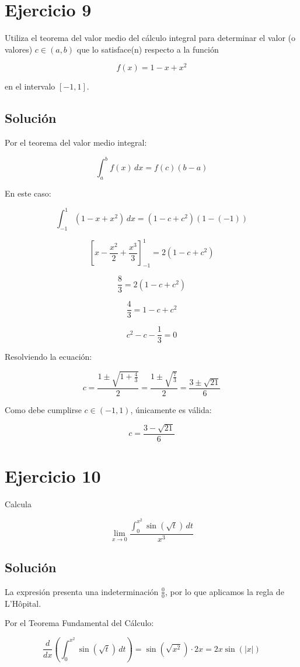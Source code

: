 \documentclass[fleqn]{article}
\begin{document}
\section{Ejercicio 9}
	Utiliza el teorema del valor medio del cálculo integral para determinar el valor
	(o valores) $c\in(a,b)$ que lo satisface(n) respecto a la función

	\[
	f(x)=1-x+x^2
	\]

	en el intervalo $[-1,1]$.

	\subsection{Solución}

	Por el teorema del valor medio integral:

	\[
	\int_a^b f(x)\,dx
	=
	f(c)(b-a)
	\]

	En este caso:

	\[
	\int_{-1}^{1}(1-x+x^2)\,dx
	=
	(1-c+c^2)(1-(-1))
	\]

	\[
	\left[
	x-\frac{x^2}{2}+\frac{x^3}{3}
	\right]_{-1}^{1}
	=
	2(1-c+c^2)
	\]

	\[
	\frac{8}{3}
	=
	2(1-c+c^2)
	\]

	\[
	\frac{4}{3}
	=
	1-c+c^2
	\]

	\[
	c^2-c-\frac{1}{3}=0
	\]

	Resolviendo la ecuación:

	\[
	c
	=
	\frac{1\pm\sqrt{1+\frac{4}{3}}}{2}
	=
	\frac{1\pm\sqrt{\frac{7}{3}}}{2}
	=
	\frac{3\pm\sqrt{21}}{6}
	\]

	Como debe cumplirse $c\in(-1,1)$, únicamente es válida:

	\[
	\boxed{
	c=\frac{3-\sqrt{21}}{6}
	}
	\]

\section{Ejercicio 10}
	Calcula

	\[
	\lim_{x\to0}
	\frac{\displaystyle\int_0^{x^2}\sin(\sqrt{t})\,dt}{x^3}
	\]

	\subsection{Solución}

	La expresión presenta una indeterminación $\frac{0}{0}$, por lo que aplicamos la regla de L'Hôpital.

	Por el Teorema Fundamental del Cálculo:

	\[
	\frac{d}{dx}
	\left(
	\int_0^{x^2}\sin(\sqrt{t})\,dt
	\right)
	=
	\sin(\sqrt{x^2})\cdot 2x
	=
	2x\sin(|x|)
	\]
\end{document}
